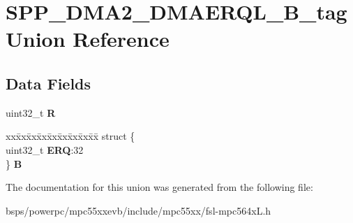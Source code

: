 \hypertarget{unionSPP__DMA2__DMAERQL__32B__tag}{}\section{S\+P\+P\+\_\+\+D\+M\+A2\+\_\+\+D\+M\+A\+E\+R\+Q\+L\+\_\+B\+\_\+tag Union Reference}
\label{unionSPP__DMA2__DMAERQL__32B__tag}
\subsection*{Data Fields}
\begin{DoxyCompactItemize}
\item 
\mbox{\label{unionSPP__DMA2__DMAERQL__32B__tag_ae684c88abee4a1e1292b87f1cca59e71}} 
uint32\+\_\+t {\bfseries R}
\item 
\mbox{\label{unionSPP__DMA2__DMAERQL__32B__tag_adf82d22cc071c7f5a34781998687efd3}} 
\begin{tabbing}
xx\=xx\=xx\=xx\=xx\=xx\=xx\=xx\=xx\=\kill
struct \{\\
\>uint32\_t {\bfseries ERQ}:32\\
\} {\bfseries B}\\

\end{tabbing}\end{DoxyCompactItemize}


The documentation for this union was generated from the following file\+:\begin{DoxyCompactItemize}
\item 
bsps/powerpc/mpc55xxevb/include/mpc55xx/fsl-\/mpc564x\+L.\+h\end{DoxyCompactItemize}
